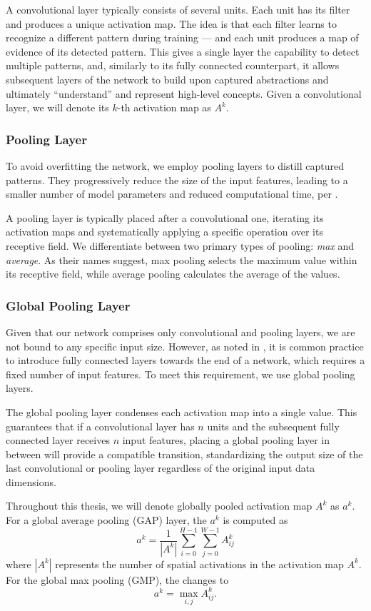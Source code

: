 A convolutional layer typically consists of several units.
Each unit has its filter and produces a unique activation map.
The idea is that each filter learns to recognize a different pattern during training --- and each unit produces a map of evidence of its detected pattern.
This gives a single layer the capability to detect multiple patterns, and, similarly to its fully connected counterpart, it allows subsequent layers of the network to build upon captured abstractions and ultimately ``understand'' and represent high-level concepts.
Given a convolutional layer, we will denote its $k$-th activation map as $A^k$.


\subsubsection{Pooling Layer}

To avoid overfitting the network, we employ pooling layers to distill captured patterns.
They progressively reduce the size of the input features, leading to a smaller number of model parameters and reduced computational time, per \cite{cnns}.

A pooling layer is typically placed after a convolutional one, iterating its activation maps and systematically applying a specific operation over its receptive field.
We differentiate between two primary types of pooling: \emph{max} and \emph{average}.
As their names suggest, max pooling selects the maximum value within its receptive field, while average pooling calculates the average of the values.

\subsubsection{Global Pooling Layer}

Given that our network comprises only convolutional and pooling layers, we are not bound to any specific input size.
However, as noted in \cite{cnns}, it is common practice to introduce fully connected layers towards the end of a network, which requires a fixed number of input features.
To meet this requirement, we use global pooling layers.

The global pooling layer condenses each activation map into a single value.
This guarantees that if a convolutional layer has $n$ units and the subsequent fully connected layer receives $n$ input features, placing a global pooling layer in between will provide a compatible transition, standardizing the output size of the last convolutional or pooling layer regardless of the original input data dimensions.

Throughout this thesis, we will denote globally pooled activation map $A^k$ as $a^k$. For a global average pooling (GAP) layer, the $a^k$ is computed as
\begin{equation}\label{gap}
    a^k = \frac{1}{|A^k|} \sum_{i=0}^{H-1} \sum_{j=0}^{W-1} A^k_{ij}
\end{equation}
where $|A^k|$ represents the number of spatial activations in the activation map $A^k$.
For the global max pooling (GMP), the  changes to
\begin{equation}
    a^k = \max_{i,j} A^k_{ij}.
\end{equation}
